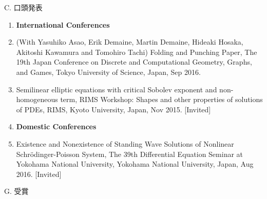 \vspace{0.2cm}
\noindent
C. 口頭発表

\vspace{0.1cm}

\begin{enumerate}
  \item[] {\bf International Conferences}
  \item (With Yasuhiko Asao, Erik Demaine, Martin Demaine, Hideaki Hosaka, Akitoshi Kawamura and Tomohiro Tachi) Folding and Punching Paper, The 19th Japan Conference on Discrete and Computational Geometry, Graphs, and Games, Tokyo University of Science, Japan, Sep 2016.
  \item Semilinear elliptic equations with critical Sobolev exponent and non-homogeneous term, RIMS Workshop: Shapes and other properties of solutions of PDEs, RIMS, Kyoto University, Japan, Nov 2015. [Invited]
  \item[] {\bf Domestic Conferences}
  \item Existence and Nonexistence of Standing Wave Solutions of Nonlinear Schr\"{o}dinger-Poisson System, The 39th Differential Equation Seminar at Yokohama National University, Yokohama National University, Japan, Aug 2016. [Invited]
\end{enumerate}

\vspace{0.2cm}
\noindent
G. 受賞

\vspace{0.1cm}

